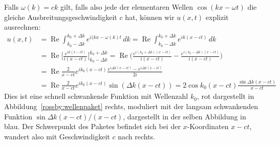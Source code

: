 Falls $\omega(k)=ck$ gilt, falls also jede der elementaren Wellen
$\cos(kx-\omega t)$ die gleiche
Ausbreitungsgeschwindigkeit $c$ hat, können wir $u(x,t)$ explizit
ausrechnen:
\begin{align*}
u(x,t)
&=
\operatorname{Re}
\int_{k_0-\Delta k}^{k_0+\Delta k}
e^{i(kx-\omega(k)t}\,dk
=
\operatorname{Re}
\int_{k_0-\Delta k}^{k_0+\Delta k}
e^{ik(x-ct)}\,dk
\\
&=
\operatorname{Re}
\biggl[
\frac{e^{ik(x-ct)}}{i(x-ct)}
\biggr]_{k_0-\Delta k}^{k_0+\Delta k}
=
\operatorname{Re}
\biggl(
\frac{e^{i(k_0+\Delta k)(x-ct)}}{i(x-ct)}
-
\frac{e^{i(k_0-\Delta k)(x-ct)}}{i(x-ct)}
\biggr)
\\
&=
\operatorname{Re}\frac{2}{x-ct}
e^{ik_0(x-ct)}\frac{e^{i\Delta k(x-ct)}-e^{i\Delta k(x-ct)}}{2i}
\\
&=
\operatorname{Re}\frac{2}{x-ct}
e^{ik_0(x-ct)}
\sin (\Delta k(x-ct))
=
2\cos k_0(x-ct) \frac{\sin \Delta k(x-ct)}{x-ct}
\end{align*}
Dies ist eine schnell schwankende Funktion mit Wellenzahl $k_0$, rot
dargestellt in Abbildung~\ref{rossby:wellenpaket} rechts, moduliert
mit der langsam schwankenden Funktion $\sin\Delta k(x-ct)/(x-ct)$,
dargestellt in der selben Abbildung in blau.
Der Schwerpunkt des Paketes befindet sich bei der $x$-Koordinaten $x-ct$,
wandert also mit Geschwindigkeit $c$ nach rechts.

